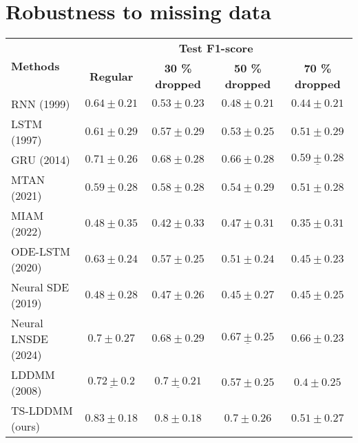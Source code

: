 \section{Robustness to missing data}

\begin{table}[hbt!]
  \centering
  \begin{tabular}{lcccc}
    \toprule
    \multirow[c]{2}{*}{\textbf{Methods}} & \multicolumn{4}{c}{\textbf{Test F1-score}} \\
    \cline{2-5}
     &  \textbf{Regular} & \textbf{30 \% dropped} &  \textbf{50 \% dropped} & \textbf{70 \% dropped} \\
    \midrule
    RNN (1999) & $0.64 \pm 0.21$ & $0.53 \pm 0.23$ & $0.48 \pm 0.21$ & $0.44 \pm 0.21$ \\
    LSTM (1997) & $0.61 \pm 0.29$ & $0.57 \pm 0.29$ & $0.53 \pm 0.25$ & $0.51 \pm 0.29$ \\
    GRU (2014) & $0.71 \pm 0.26$ & $0.68 \pm 0.28$ & $0.66 \pm 0.28$ & $\underline{0.59 \pm 0.28}$ \\
    MTAN (2021) & $0.59 \pm 0.28$ & $0.58 \pm 0.28$ & $0.54 \pm 0.29$ & $0.51 \pm 0.28$ \\
    MIAM (2022) & $0.48 \pm 0.35$ & $0.42 \pm 0.33$ & $0.47 \pm 0.31$ & $0.35 \pm 0.31$ \\
    ODE-LSTM (2020) & $0.63 \pm 0.24$ & $0.57 \pm 0.25$ & $0.51 \pm 0.24$ & $0.45 \pm 0.23$ \\
    Neural SDE (2019) & $0.48 \pm 0.28$ & $0.47 \pm 0.26$ & $0.45 \pm 0.27$ & $0.45 \pm 0.25$ \\
    Neural LNSDE (2024) & $0.7 \pm 0.27$ & $0.68 \pm 0.29$ & $\underline{0.67 \pm 0.25}$ & $\mathbf{0.66 \pm 0.23}$ \\
    LDDMM (2008) & $\underline{0.72 \pm 0.2}$ & $\underline{0.7 \pm 0.21}$ & $0.57 \pm 0.25$ & $0.4 \pm 0.25$ \\
    TS-LDDMM (ours) & $\mathbf{0.83 \pm 0.18}$ & $\mathbf{0.8 \pm 0.18}$ & $\mathbf{0.7 \pm 0.26}$ & $0.51 \pm 0.27$ \\
    \bottomrule
  \end{tabular}  
\end{table}




    

